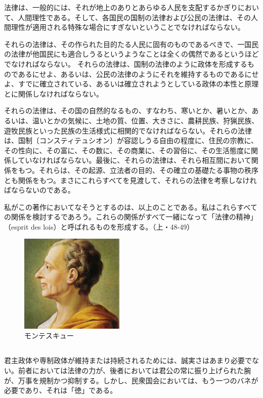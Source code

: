 法律は、一般的には、それが地上のありとあらゆる人民を支配するかぎりにおいて、人間理性である。そして、各国民の国制の法律および公民の法律は、その人間理性が適用される特殊な場合にすぎないということでなければならない。

それらの法律は、その作られた目的たる人民に固有のものであるべきで、一国民の法律が他国民にも適合しうるというようなことは全くの偶然であるというほどでなければならない。
それらの法律は、国制の法律のように政体を形成するものであるにせよ、あるいは、公民の法律のようにそれを維持するものであるにせよ、すでに確立されている、あるいは確立されようとしている政体の本性と原理とに関係しなければならない。

それらの法律は、その国の自然的なるもの、すなわち、寒いとか、暑いとか、あるいは、温いとかの気候に、土地の質、位置、大きさに、農耕民族、狩猟民族、遊牧民族といった民族の生活様式に相関的でなければならない。それらの法律は、国制〔コンスティテュシオン〕が容認しうる自由の程度に、住民の宗教に、その性向に、その富に、その数に、その商業に、その習俗に、その生活態度に関係していなければならない。最後に、それらの法律は、それら相互間において関係をもつ。それらは、その起源、立法者の目的、その確立の基礎たる事物の秩序とも関係をもつ。まさにこれらすべてを見渡して、それらの法律を考察しなければならないのである。

私がこの著作においてなそうとするのは、以上のことである。私はこれらすべての関係を検討するであろう。これらの関係がすべて一緒になって「法律の精神」（esprit des lois）と呼ばれるものを形成する。（上・48-49）


 \begin{figure}[htbp]
   \centering
     \includegraphics[width=50mm]{images/montesquieu.jpg}
   \caption{モンテスキュー}
 \end{figure}


\subsection{}



君主政体や専制政体が維持または持続されるためには、誠実さはあまり必要でない。前者においては法律の力が、後者においては君公の常に振り上げられた腕が、万事を規制かつ抑制する。しかし、民衆国会においては、もう一つのバネが必要であり、それは「徳」である。

